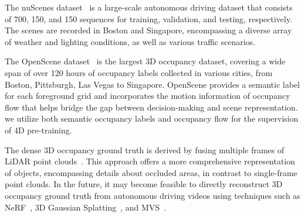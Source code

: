 The nuScenes dataset~\cite{nuscenes} is a large-scale autonomous driving dataset that consists of 700, 150, and 150 sequences for training, validation, and testing, respectively. The scenes are recorded in Boston and Singapore, encompassing a diverse array of weather and lighting conditions, as well as various traffic scenarios.

The OpenScene dataset~\cite{openscene} is the largest 3D occupancy dataset, covering a wide span of over 120 hours of occupancy labels collected in various cities, from Boston, Pittsburgh, Las Vegas to Singapore. OpenScene provides a semantic label for each foreground grid and incorporates the motion information of occupancy flow that helps bridge the gap between decision-making and scene representation. we utilize both semantic occupancy labels and occupancy flow for the supervision of 4D pre-training. 

The dense 3D occupancy ground truth is derived by fusing multiple frames of LiDAR point clouds~\cite{occnet,uniscene}. This approach offers a more comprehensive representation of objects, encompassing details about occluded areas, in contrast to single-frame point clouds. In the future, it may become feasible to directly reconstruct 3D occupancy ground truth from autonomous driving videos using techniques such as NeRF~\cite{nerf,nerf2}, 3D Gaussian Splatting~\cite{3dgs}, and MVS~\cite{mvsnet,bi,aa-rmvsnet}.

